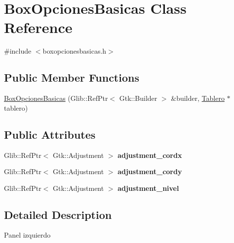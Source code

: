\hypertarget{classBoxOpcionesBasicas}{\section{Box\-Opciones\-Basicas Class Reference}
\label{classBoxOpcionesBasicas}
}


{\ttfamily \#include $<$boxopcionesbasicas.\-h$>$}

\subsection*{Public Member Functions}
\begin{DoxyCompactItemize}
\item 
\hyperlink{classBoxOpcionesBasicas_a10d9db15b257fc95714511754206fb79}{Box\-Opciones\-Basicas} (Glib\-::\-Ref\-Ptr$<$ Gtk\-::\-Builder $>$ \&builder, \hyperlink{classTablero}{Tablero} $\ast$tablero)
\end{DoxyCompactItemize}
\subsection*{Public Attributes}
\begin{DoxyCompactItemize}
\item 
\hypertarget{classBoxOpcionesBasicas_ac75c6d189a34482d64b4909334f33e4d}{Glib\-::\-Ref\-Ptr$<$ Gtk\-::\-Adjustment $>$ {\bfseries adjustment\-\_\-cordx}}\label{classBoxOpcionesBasicas_ac75c6d189a34482d64b4909334f33e4d}

\item 
\hypertarget{classBoxOpcionesBasicas_a16a619543f0e8741edaf208180183a3d}{Glib\-::\-Ref\-Ptr$<$ Gtk\-::\-Adjustment $>$ {\bfseries adjustment\-\_\-cordy}}\label{classBoxOpcionesBasicas_a16a619543f0e8741edaf208180183a3d}

\item 
\hypertarget{classBoxOpcionesBasicas_a0fab1216f037c21255707ba4d9270968}{Glib\-::\-Ref\-Ptr$<$ Gtk\-::\-Adjustment $>$ {\bfseries adjustment\-\_\-nivel}}\label{classBoxOpcionesBasicas_a0fab1216f037c21255707ba4d9270968}

\end{DoxyCompactItemize}


\subsection{Detailed Description}
Panel izquierdo 

